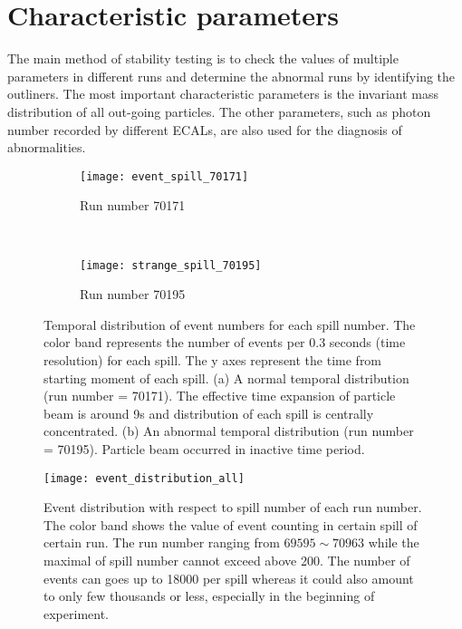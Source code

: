 \section{Characteristic parameters}
The main method of stability testing is to check the values of multiple parameters in different runs and determine the abnormal runs by identifying the outliners. The most important characteristic parameters is the invariant mass distribution of all out-going particles. The other parameters, such as photon number recorded by different ECALs, are also used for the diagnosis of abnormalities.

\begin{figure*}[!ht]
	\centering
	\begin{subfigure}[b]{0.49\textwidth}
		\texttt{[image: event\_spill\_70171]}
		\caption{Run number 70171}
		\label{fig:EveN_spill_normal}
	\end{subfigure}
	~ %
	\begin{subfigure}[b]{0.49\textwidth}
		\texttt{[image: strange\_spill\_70195]}
		\caption{Run number 70195}
		\label{fig:EveN_spill_abnormal}
	\end{subfigure}
	\caption{Temporal distribution of event numbers for each spill number. The color band represents the number of events per 0.3 seconds (time resolution) for each spill. The y axes represent the time from starting moment of each spill. (a) A normal temporal distribution (run number = 70171). The effective time expansion of particle beam is around 9s and distribution of each spill is centrally concentrated. (b) An abnormal temporal distribution (run number = 70195). Particle beam occurred in inactive time period.}
	\label{fig:animals}
\end{figure*}

\begin{figure*}[!h]
	\centering
	\texttt{[image: event\_distribution\_all]}
	\caption{Event distribution with respect to spill number of each run number. The color band shows the value of event counting in certain spill of certain run. The run number ranging from $69595 \sim 70963$ while the maximal of spill number cannot exceed above 200. The number of events can goes up to 18000 per spill whereas it could also amount to only few thousands or less, especially in the beginning of experiment. }
	\label{fig:event_distribution_all}
\end{figure*}

